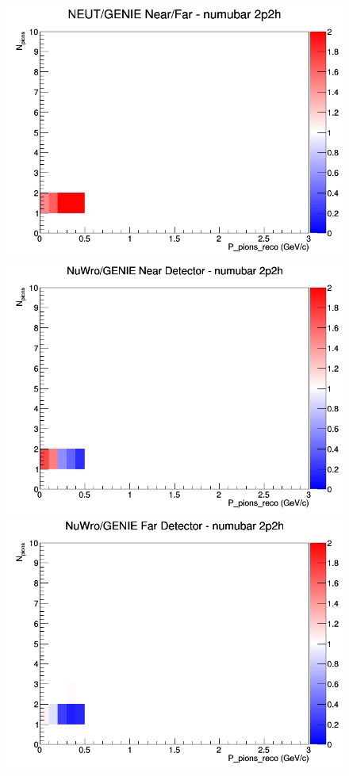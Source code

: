\documentclass[12pt]{article}
\begin{document}
\begin{figure}[h]
\endminipage
{}
\includegraphics[width=\linewidth]{eff_N_P/FGT/pions/ratios/2p2h_NEUT_GENIE_numubar_NF_N_P.png}
\endminipage
\newline
{}
\includegraphics[width=\linewidth]{eff_N_P/FGT/pions/ratios/2p2h_NuWro_GENIE_numubar_near_N_P.png}
\endminipage
{}
\includegraphics[width=\linewidth]{eff_N_P/FGT/pions/ratios/2p2h_NuWro_GENIE_numubar_far_N_P.png}

\end{figure}
\end{document}

